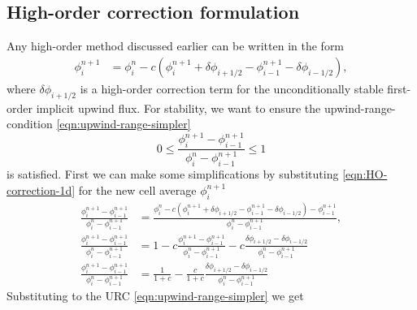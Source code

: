 \documentclass[../thesis.tex]{subfiles}
\begin{document}
\subsection{High-order correction formulation}
Any high-order method discussed earlier can be written in the form
\begin{equation}\label{eqn:HO-correction-1d}
    \begin{split}
        \phi_{i}^{n+1}
        &= \phi_{i}^{n} - c\left(
            \phi_{i}^{n+1}
            + \delta \phi_{i+1/2} - \phi_{i-1}^{n+1}
            - \delta \phi_{i-1/2} \right),
    \end{split}
\end{equation}
where \(\delta \phi_{i+1/2}\) is a high-order correction term for the unconditionally stable first-order implicit upwind flux.
For stability, we want to ensure the upwind-range-condition \eqref{eqn:upwind-range-simpler}
\[
    0
    \leq
    \frac{\phi_{i}^{n+1} - \phi_{i-1}^{n+1}}
    {\phi_{i}^{n} - \phi_{i-1}^{n+1}}
    \leq
    1
\]
is satisfied.
First we can make some simplifications by substituting \eqref{eqn:HO-correction-1d} for the new cell average \(\phi_{i}^{n+1}\)
\begin{equation}
    \begin{split}
        \frac{\phi_{i}^{n+1} - \phi_{i-1}^{n+1}}
            {\phi_{i}^{n} - \phi_{i-1}^{n+1}}
        &=
        \frac{\phi_{i}^{n} - c\left(
                \phi_{i}^{n+1} + \delta \phi_{i+1/2}
                - \phi_{i-1}^{n+1} - \delta \phi_{i-1/2}
                \right) - \phi_{i-1}^{n+1}}
            {\phi_{i}^{n} - \phi_{i-1}^{n+1}},
        \\
        \frac{\phi_{i}^{n+1} - \phi_{i-1}^{n+1}}
            {\phi_{i}^{n} - \phi_{i-1}^{n+1}}
        &=
        1 - c\frac{\phi_{i}^{n+1} - \phi_{i-1}^{n+1}}
        {\phi_{i}^{n} - \phi_{i-1}^{n+1}}
        -c\frac{\delta \phi_{i+1/2} - \delta \phi_{i-1/2}}
        {\phi_{i}^{n} - \phi_{i-1}^{n+1}}
        \\
        \frac{\phi_{i}^{n+1} - \phi_{i-1}^{n+1}}
            {\phi_{i}^{n} - \phi_{i-1}^{n+1}}
        &=
        \frac{1}{1+c}
        -\frac{c}{1+c}\frac{\delta \phi_{i+1/2} - \delta \phi_{i-1/2}}
        {\phi_{i}^{n} - \phi_{i-1}^{n+1}}
    \end{split}
\end{equation}
Substituting to the URC \eqref{eqn:upwind-range-simpler} we get
\end{document}
